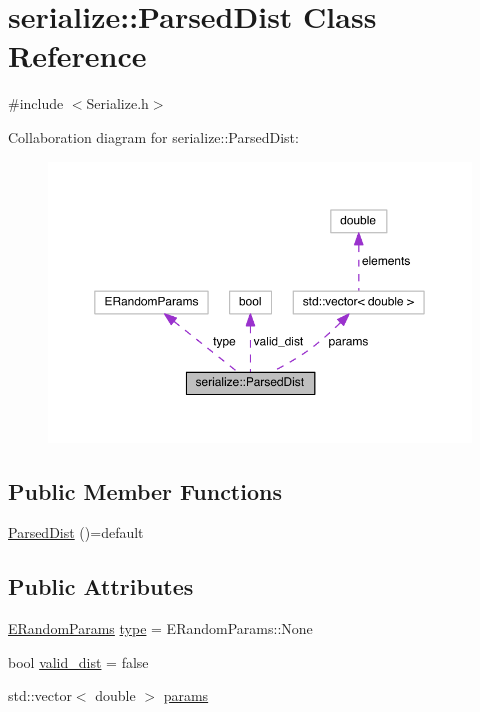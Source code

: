 \hypertarget{classserialize_1_1_parsed_dist}{}\section{serialize\+:\+:Parsed\+Dist Class Reference}
\label{classserialize_1_1_parsed_dist}


{\ttfamily \#include $<$Serialize.\+h$>$}



Collaboration diagram for serialize\+:\+:Parsed\+Dist\+:
\nopagebreak
\begin{figure}[H]
\begin{center}
\leavevmode
\includegraphics[width=350pt]{classserialize_1_1_parsed_dist__coll__graph}
\end{center}
\end{figure}
\subsection*{Public Member Functions}
\begin{DoxyCompactItemize}
\item 
\hyperlink{classserialize_1_1_parsed_dist_a4b958cf4110be01779d06d099e1fa90c}{Parsed\+Dist} ()=default
\end{DoxyCompactItemize}
\subsection*{Public Attributes}
\begin{DoxyCompactItemize}
\item 
\hyperlink{namespacesolar__core_a1a8e58483c0cf418bd680fc3a0ca8222}{E\+Random\+Params} \hyperlink{classserialize_1_1_parsed_dist_add184f5c1c9744070ad51aa48db107f7}{type} = E\+Random\+Params\+::\+None
\item 
bool \hyperlink{classserialize_1_1_parsed_dist_af3c62d6c17845cb3be62c495e4d742db}{valid\+\_\+dist} = false
\item 
std\+::vector$<$ double $>$ \hyperlink{classserialize_1_1_parsed_dist_a6a50a88c43c55a01e340122be873ebdb}{params}
\end{DoxyCompactItemize}


